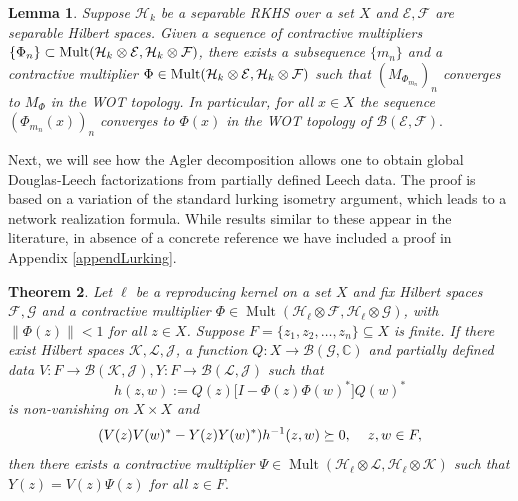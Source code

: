 \documentclass[a4paper,reqno,index]{amsart}
\numberwithin{equation}{section}
\newtheorem{theorem}{Theorem}[section]
\newtheorem{lemma}[theorem]{Lemma}
\newcommand{\Mult}{\operatorname{Mult}}
\newcommand{\opphi}[4]{{#1}\in \Mult({#3},{#4})}
\theoremstyle{definition}
\begin{document}
\begin{lemma}\label{noholmontel}
Suppose $\mathcal{H}_k$ be a separable RKHS over a set $X$ and  $\mathcal{E}, \mathcal{F}$  are separable Hilbert spaces. Given a sequence of contractive multipliers $\{\Phi_n\}\subset\textup{Mult}(\mathcal{H}_k\otimes\mathcal{E}, \mathcal{H}_k\otimes\mathcal{F})$, there exists a subsequence $\{m_n\}$ and a contractive multiplier $\Phi\in \textup{Mult}(\mathcal{H}_k\otimes\mathcal{E}, \mathcal{H}_k\otimes\mathcal{F})$ such that $(M_{\Phi_{m_n}})_n$ converges to $M_{\Phi}$ in the WOT topology. In particular, for all $x\in X$ the sequence $(\Phi_{m_n}(x))_n$ converges to $\Phi(x)$ in the WOT topology of $\mathcal{B}(\mathcal{E}, \mathcal{F}).$ 
\end{lemma}


Next, we will see how the Agler decomposition allows one to obtain global Douglas-Leech factorizations from partially defined Leech data. The proof is based on a variation of the
standard lurking isometry argument, which leads to a network realization formula. While results similar to these appear in the literature, in absence of a concrete
reference we have included a proof in Appendix \ref{appendLurking}.



\begin{theorem} \label{realization.}
Let $\ell$ be a reproducing kernel on a set $X$ and fix Hilbert spaces $\mathcal{F}, \mathcal{G}$ and 
a contractive multiplier $\opphi{\Phi}{X}{\mathcal{H}_{\ell}\otimes\mathcal{F}}{ \mathcal{H}_{\ell}\otimes\mathcal{G}}$, {with $\|\Phi(z)\|<1$ for all $z\in X$}. Suppose $F=\{z_1,z_2,\dots,z_n\}\subseteq X$
is finite. If   there exist Hilbert spaces $  \mathcal{K}, \mathcal{L}, \mathcal{J}$, a function $Q:X\to\mathcal{B}(\mathcal{G},\mathbb{C})$ and partially defined data $V:F\to\mathcal{B}(\mathcal{K}, \mathcal{J}), Y:F\to\mathcal{B}(\mathcal{L}, \mathcal{J})$  such that 
\[
  h(z,w):=Q(z)\big[I-\Phi(z)\Phi(w)^*\big]Q(w)^*
\]
 is non-vanishing on $X\times X$ and 
\begin{equation*} %
(V(z)V(w)^*-Y(z)Y(w)^*)h^{-1}(z, w)\succeq 0, \hspace*{0.4 cm} z, w\in F,
\end{equation*}
then there exists a contractive multiplier $\opphi{\Psi}{X}{\mathcal{H}_{\ell}\otimes\mathcal{L}}{\mathcal{H}_{\ell}\otimes\mathcal{K}}$ such that $Y(z)=V(z)\Psi(z)$ for all $z\in F.$
\end{theorem}
\end{document}
